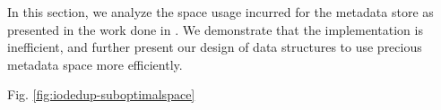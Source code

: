 
In this section, we analyze the space usage incurred for the metadata
store as presented in the work done in \cite{iodedup}. We demonstrate that
the implementation is inefficient, and further present our design of
data structures to use precious metadata space more efficiently.

Fig. \ref{fig:iodedup-suboptimalspace}

